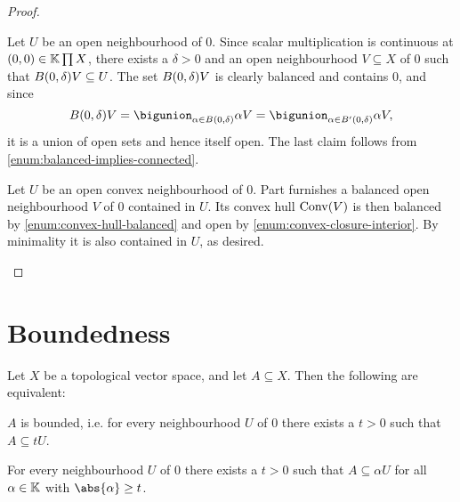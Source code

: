 \documentclass[article, a4paper, 11pt, oneside]{memoir}
\numberwithin{equation}{chapter}
\begin{document}
\begin{proof}
\begin{proofsec}
    \item[Proof of \subcref{enum:balanced-local-basis}]
    Let $U$ be an open neighbourhood of $0$. Since scalar multiplication is continuous at $(0,0) \in \mathbb{K} \prod X$, there exists a $\delta > 0$ and an open neighbourhood $V \subseteq X$ of $0$ such that $B_{}(0,\delta) V \subseteq U$. The set $B_{}(0,\delta) V$ is clearly balanced and contains $0$, and since
    \begin{equation*}
        \ball{0}{\delta} V
            = \bigunion_{\alpha \in \ball{0}{\delta}} \alpha V
            = \bigunion_{\alpha \in \pball{0}{\delta}} \alpha V,
    \end{equation*}
    it is a union of open sets and hence itself open. The last claim follows from \cref{enum:balanced-implies-connected}.

    \item[Proof of \subcref{enum:convex-balanced-local-basis}]
    Let $U$ be an open convex neighbourhood of $0$. Part  furnishes a balanced open neighbourhood $V$ of $0$ contained in $U$. Its convex hull $\operatorname{Conv}(V)$ is then balanced by \cref{enum:convex-hull-balanced} and open by \cref{enum:convex-closure-interior}. By minimality it is also contained in $U$, as desired.
\end{proofsec}
\end{proof}


\section{Boundedness}

\begin{corollary}
    \label{thm:boundedness-equivalent-definitions}
    Let $X$ be a topological vector space, and let $A \subseteq X$. Then the following are equivalent:
    \begin{enumcor}
        \item \label{enum:boundedness-definition-restatement} $A$ is bounded, i.e. for every neighbourhood $U$ of $0$ there exists a $t > 0$ such that $A \subseteq tU$.
        \item \label{enum:boundedness-equivalent-definition} For every neighbourhood $U$ of $0$ there exists a $t > 0$ such that $A \subseteq \alpha U$ for all $\alpha \in \mathbb{K}$ with $\abs{\alpha} \geq t$.
    \end{enumcor}
\end{corollary}
\end{document}

